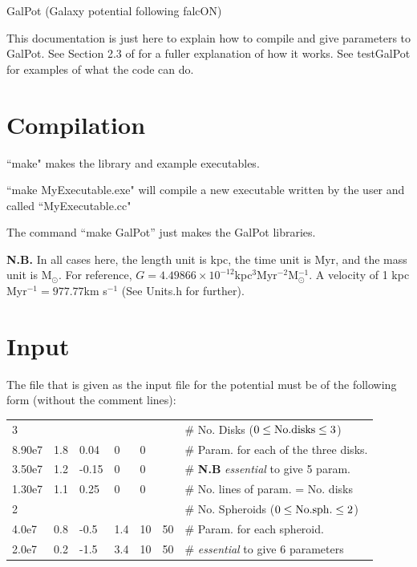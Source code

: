 \documentclass{article}
\begin{document}
\begin{center}
{\huge GalPot (Galaxy potential following falcON)}
\end{center}


This documentation is just here to explain how to compile and give parameters to
GalPot. See Section 2.3 of \citet{DB98} for a fuller explanation of how it works.
See testGalPot for examples of what the code can do.

\section{Compilation}
``make" makes the library and example executables.

\noindent``make MyExecutable.exe" will compile a new executable written by the user and called ``MyExecutable.cc"

\noindent The command ``make GalPot'' just makes the GalPot libraries.

 {\bf N.B.} In all cases here, the length unit is kpc, the time unit is Myr, and the mass unit is
M$_\odot$. For reference, $G=4.49866\times
10^{-12}$kpc$^3$Myr$^{-2}$M$_\odot^{-1}$. A velocity of 1 kpc Myr$^{-1}
  = 977.77$km s$^{-1}$ (See Units.h for further).

\section{Input}
The file that is given as the input file for the potential must be of
the following form (without the comment lines):
\vspace{5mm}

\begin{tabular}{lllllll}
3      &     &      &     &    &     &\# No. Disks ($0\leq{\rm No.disks}\leq3$) \\
8.90e7 & 1.8 & 0.04 & 0   & 0  &     &\# Param. for each of the three disks.\\
3.50e7 & 1.2 & -0.15& 0   & 0  &     &\# {\bf N.B} {\it essential} to
give 5 param.\\
1.30e7 & 1.1 & 0.25 & 0   & 0  &     &\# No. lines of param. = No. disks\\
2      &     &      &     &    &     &\# No. Spheroids ($0\leq{\rm
  No. sph.}\leq2$) \\
4.0e7   & 0.8 & -0.5 & 1.4 & 10 & 50 &\#  Param. for each spheroid. \\
2.0e7   & 0.2 & -1.5 & 3.4 & 10 & 50 &\# {\it essential} to give 6 parameters\\
\end{tabular}
\end{document}
